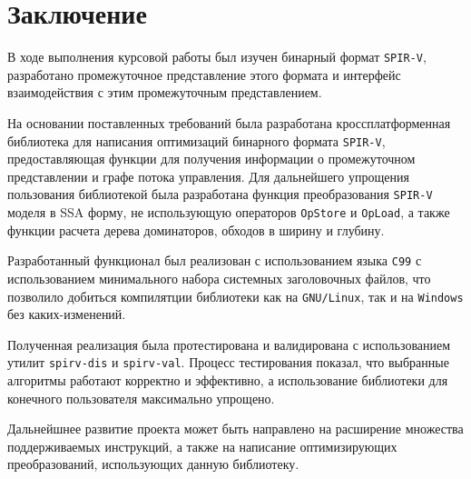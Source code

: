 \documentclass[14pt]{extarticle}
\begin{document}
\newpage
\section*{Заключение}
В ходе выполнения курсовой работы был изучен бинарный формат \texttt{SPIR-V}, разработано промежуточное представление этого формата и интерфейс взаимодействия с этим промежуточным представлением.

На основании поставленных требований была разработана кроссплатформенная библиотека для написания оптимизаций бинарного формата \texttt{SPIR-V}, предоставляющая функции для получения информации о промежуточном представлении и графе потока управления. Для дальнейшего упрощения пользования библиотекой была разработана функция преобразования \texttt{SPIR-V} моделя в SSA форму, не использующую операторов \texttt{OpStore} и \texttt{OpLoad}, а также функции расчета дерева доминаторов, обходов в ширину и глубину.

Разработанный функционал был реализован с использованием языка \texttt{C99} с использованием минимального набора системных заголовочных файлов, что позволило добиться компилятции библиотеки как на \texttt{GNU/Linux}, так и на \texttt{Windows} без каких-изменений.

Полученная реализация была протестирована и валидирована с использованием утилит \texttt{spirv-dis} и \texttt{spirv-val}. Процесс тестирования показал, что выбранные алгоритмы работают корректно и эффективно, а использование библиотеки для конечного пользователя максимально упрощено.

Дальнейшнее развитие проекта может быть направлено на расширение множества поддерживаемых инструкций, а также на написание оптимизирующих преобразований, использующих данную библиотеку.
\end{document}
